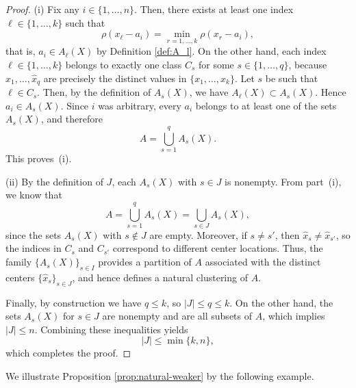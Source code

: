 \documentclass[11pt]{article}
\theoremstyle{definition}
\newcommand{\1}{\mathbf{1}}
\begin{document}
\begin{proof}
(i) Fix any $i\in\{1,\dots,n\}$. Then, there exists at least one index 
$\ell\in\{1,\dots,k\}$ such that
\[
\rho(x_\ell-a_i)=\min_{r=1,\dots,k}\rho(x_r-a_i),
\]
that is, $a_i\in A_\ell(X)$ by Definition \ref{def:A_l}.
On the other hand, each index $\ell\in\{1,\dots,k\}$ belongs to exactly one
class $C_s$ for some $s\in\{1,\dots,q\}$, because
$\widehat x_1,\dots,\widehat x_q$ are precisely the distinct values in
$\{x_1,\dots,x_k\}$. Let $s$ be such that $\ell\in C_s$. Then, by the
definition of $A_s(X)$, we have $A_\ell(X)\subset A_s(X)$. Hence
$a_i\in A_s(X)$.
Since $i$ was arbitrary, every $a_i$ belongs to at least one of the sets
$A_s(X)$, and therefore
\[
A=\bigcup_{s=1}^q A_s(X).
\]
This proves~\textup{(i)}.

\medskip\noindent
(ii) By the definition of $J$, each $A_s(X)$ with $s\in J$ is nonempty. From part~\textup{(i)}, we know that
\[
A=\bigcup_{s=1}^q A_s(X)=\bigcup_{s\in J}A_s(X),
\]
since the sets $A_s(X)$ with $s\notin J$ are empty.
Moreover, if $s\neq s'$, then $\widehat x_s\neq\widehat x_{s'}$, so the
indices in $C_s$ and $C_{s'}$ correspond to different center locations.
 Thus, the
family $\{A_s(X)\}_{s\in I}$ provides a partition of $A$ associated with the
distinct centers $\{\widehat x_s\}_{s\in J}$, and hence defines a natural
clustering of $A$. 

Finally, by construction we have $q\le k$, so $|J|\le q\le k$. On the other
hand, the sets $A_s(X)$ for $s\in J$ are nonempty and are all subsets of $A$,
which implies $|J|\le n$. Combining these inequalities yields
\[
|J|\le\min\{k,n\},
\]
which completes the proof.
\end{proof}

We illustrate Proposition \ref{prop:natural-weaker} by the following example.
\end{document}
